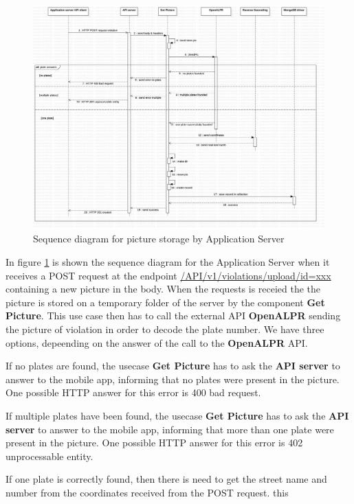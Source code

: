 \begin{figure}[H]
\centering
\includegraphics[width=\textwidth]{Images/DDSeqSeverPic.png}
\caption{\label{fig:DDSeqSeverPic} Sequence diagram for picture storage by Application Server}
\end{figure}
In figure \ref{fig:DDSeqSeverPic} is shown the sequence diagram for the Application Server when it receives a POST request at the endpoint \url{/API/v1/violations/upload/id=xxx} containing a new picture in the body. When the requests is receied the the picture is stored on a temporary folder of the server by the component \textbf{Get Picture}. This use case then has to call the external API \textbf{OpenALPR} sending the picture of violation in order to decode the plate number. We have three options, depeending on the answer of the call to the \textbf{OpenALPR} API.

If no plates are found, the usecase \textbf{Get Picture} has to ask the \textbf{API server} to answer to the mobile app, informing that no plates were present in the picture. One possible HTTP answer for this error is \textcolor{poliblue}{400 bad request}.

If multiple plates have been found, the usecase \textbf{Get Picture} has to ask the \textbf{API server} to answer to the mobile app, informing that more than one plate were present in the picture. One possible HTTP answer for this error is \textcolor{poliblue}{402 unprocessable entity}.

If one plate is correctly found, then there is need to get the street name and number from the coordinates received from the POST request. this


